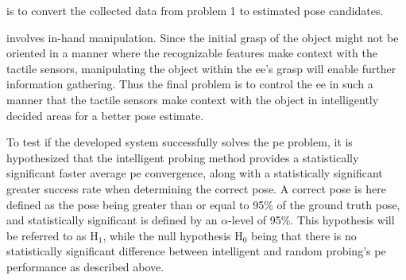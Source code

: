 \begin{problem} \label{prob:2}
	\normalfont is to convert the collected data from problem 1 to estimated pose candidates.
\end{problem}

\begin{problem} \label{prob:3}
	\normalfont involves in-hand manipulation. Since the initial grasp of the object might not be oriented in a manner where the recognizable features make context with the tactile sensors, manipulating the object within the \gls{ee}'s grasp will enable further information gathering. Thus the final problem is to control the \gls{ee} in such a manner that the tactile sensors make context with the object in intelligently decided areas for a better pose estimate.
\end{problem}

To test if the developed system successfully solves the \gls{pe} problem, it is hypothesized that the intelligent probing method provides a statistically significant faster average \gls{pe} convergence, along with a statistically significant greater success rate when determining the correct pose. A correct pose is here defined as the pose being greater than or equal to 95\% of the ground truth pose, and statistically significant is defined by an $\alpha$-level of 95\%. This hypothesis will be referred to as $\text{H}_1$, while the null hypothesis $\text{H}_0$ being that there is no statistically significant difference between intelligent and random probing's \gls{pe} performance as described above.




